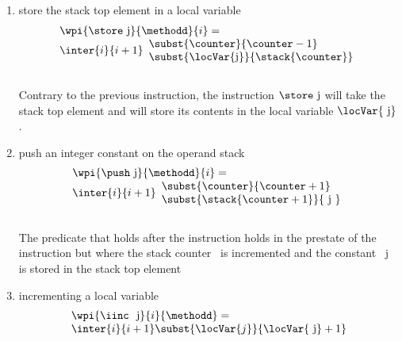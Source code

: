 \begin{itemize}
\begin{enumerate}
		\item store the stack top element in a local variable	 \\	 
		$$ \begin{array}{l}
                          \wpi{\store \ \mbox{\rm j} } { \methodd}{i}  =   \\ 
		\inter{i}{i+1}\begin{array}{l} 
                                    \subst{\counter}{\counter   - 1} \\
				    \subst{\locVar{\mbox{\rm j}} }{\stack{ \counter}}  
			       \end{array}
                   \end{array} $$ \\
		  
		  Contrary to the previous instruction, the instruction $\store \ \mbox{\rm j}$ will take the stack top element
		  and will store its contents in the local variable $\locVar{\mbox{ \rm j}}$.

		\item push an integer constant on the operand stack  \\
			$$\begin{array}{l}
                          \wpi{\push  \  \mbox{\rm j} }  {\methodd} {i} =   \\
			  \inter{i}{i+1}\begin{array}{l}  
                                    \subst{\counter}{ \counter   + 1} \\ 
                                    \subst{\stack{ \counter +1 }}{ \mbox{ \rm j }}
			         \end{array}			
			\end{array} $$ \\
		   The predicate that holds after the instruction holds in the prestate of the instruction but where the stack counter \counter \
		   is incremented and the constant \mbox{ \rm j } is stored in the stack top element
	
		\item incrementing a local variable 
				$$ \begin{array}{l}
                                          \wpi{\iinc \   \mbox{ \rm j} } {i} {\methodd}   =  \\
				          \inter{i}{i+1} \subst{ \locVar{  j} }{  \locVar{\mbox{ \rm j}} + 1 } 
                                   \end{array}$$
		  
	\end{enumerate}
	

\end{itemize}
